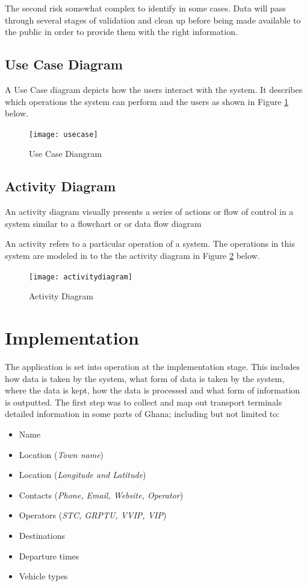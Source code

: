 The second risk somewhat complex to identify in some cases. Data will pass through several stages of validation and clean up before being made available to the public in order to provide them with the right information.

\subsection{Use Case Diagram}
A Use Case diagram depicts how the users interact with the system. It describes which operations the system can perform and the users as shown in Figure \ref{fig:usecase} below.

\begin{figure}[H]
	\centering
	\texttt{[image: usecase]}
	\caption[Use Case Diangram]{Use Case Diangram}
	\label{fig:usecase}
\end{figure}


\subsection{Activity Diagram}
An activity diagram visually presents a series of actions or flow of control in a system similar to a flowchart or or data flow diagram 

An activity refers to a particular operation of a system. The operations in this system are modeled in to the the activity diagram in Figure \ref{fig:activitydiagram} below.
\begin{figure}[H]
	\centering
	\texttt{[image: activitydiagram]}
	\caption[Activity Diagram]{Activity Diagram}
	\label{fig:activitydiagram}
\end{figure}

\section{Implementation}
The application is set into operation at the implementation stage. This includes how data is taken by the system, what form of data is taken by the system, where the data is kept, how the data is processed and what form of information is outputted. The first step was to collect and map out transport terminals detailed information in some parts of Ghana; including but not limited to:
\begin{itemize}
	\item Name
	\item Location (\textit{Town name})
	\item Location (\textit{Longitude and Latitude})
	\item Contacts (\textit{Phone, Email, Website, Operator})
	\item Operators (\textit{STC, GRPTU, VVIP, VIP})
	\item Destinations
	\item Departure times
	\item Vehicle types
\end{itemize}

